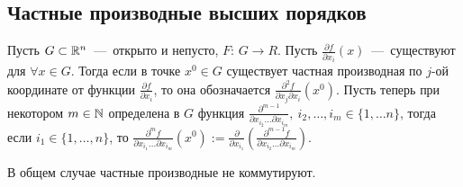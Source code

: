 \subsection{Частные производные высших порядков}
\begin{definition}
    Пусть $G \subset \mathbb{R}^n$~---~открыто и непусто, $F$: $G \rightarrow R$. Пусть $\frac{\partial f}{\partial x_i}(x)$~---~существуют для $\forall x \in G$. Тогда если в точке $x^0 \in G$ существует частная производная по $j$-ой координате от функции $\frac{\partial f}{\partial x_i}$, то она обозначается $\frac{\partial^2f}{\partial x_j \partial x_i}(x^0)$. Пусть теперь при некотором $m \in \mathbb{N}$ определена в $G$ функция $\frac{\partial^{m -1}}{\partial x_{i_2} \dots \partial x_{i_m}}, \ i_2, \dots, i_m \in \{1, \dots n\}$, тогда если $i_1 \in \{1, \dots, n\}$, то $\frac{\partial^mf}{\partial x_{i_1}\dots\partial x_{i_m}}(x^0) := \frac{\partial}{\partial x_{i_1}}\left(\frac{\partial^{m - 1}f}{\partial x_{i_2}\dots \partial x_{i_m}}\right)$.
\end{definition}
\begin{note}
    В общем случае частные производные не коммутируют.
\end{note}
